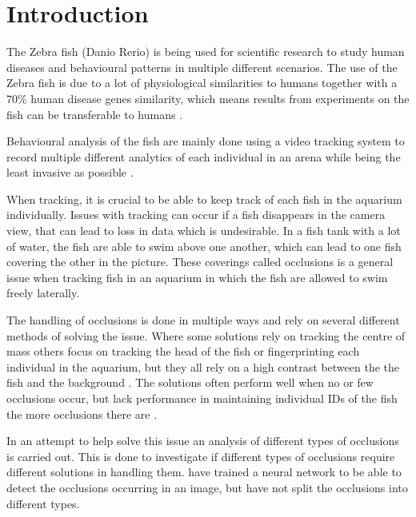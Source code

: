 \chapter{Introduction}\label{ch:intro}
The Zebra fish (Danio Rerio) is being used for scientific research to study human diseases and behavioural patterns in multiple different scenarios. The use of the Zebra fish is due to a lot of physiological similarities to humans together with a 70\% human disease genes similarity, which means results from experiments on the fish can be transferable to humans \citep{RahmanKhan2018, Delcourt2018}.

Behavioural analysis of the fish are mainly done using a video tracking system to record multiple different analytics of each individual in an arena while being the least invasive as possible \citep{Levin2009, Delcourt2018}. 

When tracking, it is crucial to be able to keep track of each fish in the aquarium individually. Issues with tracking can occur if a fish disappears in the camera view, that can lead to loss in data which is undesirable. In a fish tank with a lot of water, the fish are able to swim above one another, which can lead to one fish covering the other in the picture. These coverings called occlusions is a general issue when tracking fish in an aquarium in which the fish are allowed to swim freely laterally.

The handling of occlusions is done in multiple ways and rely on several different methods of solving the issue. Where some solutions rely on tracking the centre of mass others focus on tracking the head of the fish or fingerprinting each individual in the aquarium, but they all rely on a high contrast between the the fish and the background \citep{Delcourt2018}. The solutions often perform well when no or few occlusions occur, but lack performance in maintaining individual IDs of the fish the more occlusions there are \citep{Delcourt2018}.

In an attempt to help solve this issue an analysis of different types of occlusions is carried out. This is done to investigate if different types of occlusions require different solutions in handling them. \cite{Romero-Ferrero2019} have trained a neural network to be able to detect the occlusions occurring in an image, but have not split the occlusions into different types. 